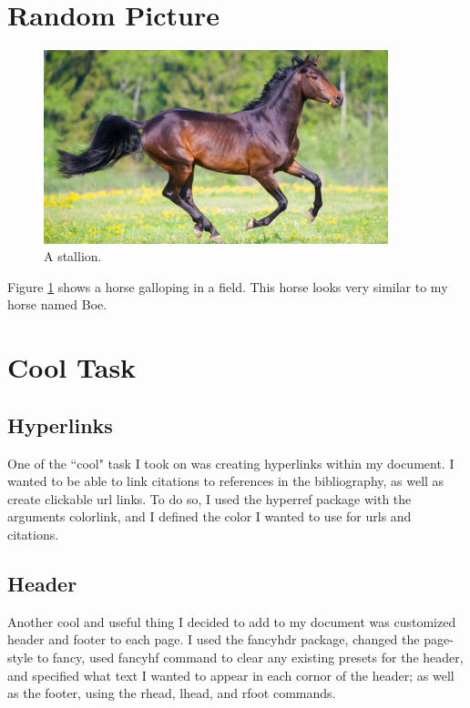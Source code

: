 \documentclass[12pt, letterpaper]{article} %
\begin{document}
\section{Random Picture} %
\begin{figure}[!h] %
    \begin{center} %
        \includegraphics[width=10cm]{horse.png}  %
        \caption{A stallion.} %
        \label{fig:horse} %
    \end{center} %
\end{figure} %
Figure \ref{fig:horse} %
shows a horse galloping in a field. This horse looks very similar to my horse named Boe. 

\section{Cool Task } %
\subsection{Hyperlinks} %
One of the ``cool" task I took on was creating hyperlinks within my document. I wanted to be able to link citations to references in the bibliography, as well as create clickable url links. To do so, I used the hyperref package with the arguments colorlink, and I defined the color I wanted to use for urls and citations. 
\subsection{Header} %
Another cool and useful thing I decided to add to my document was customized header and footer to each page. I used the fancyhdr package, changed the page-style to fancy, used fancyhf command to clear any existing presets for the header, and specified what text I wanted to appear in each cornor of the header; as well as the footer, using the rhead, lhead, and rfoot commands. 

\newpage %
\end{document}
